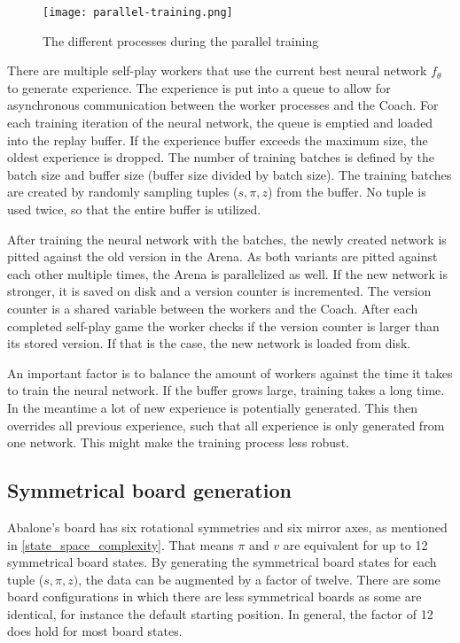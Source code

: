 \begin{figure}[H]
    \centering
    \texttt{[image: parallel-training.png]}
    \caption{The different processes during the parallel training \cite[cf. p. 45]{bruasdal_deep_2020}}
    \label{parallel_training_pipeline}
\end{figure}

There are multiple self-play workers that use the current best neural network $f_{\theta}$ to generate experience. The experience is put into a queue to allow for asynchronous communication between the worker processes and the Coach. For each training iteration of the neural network, the queue is emptied and loaded into the replay buffer. If the experience buffer exceeds the maximum size, the oldest experience is dropped. The number of training batches is defined by the batch size and buffer size (buffer size divided by batch size). The training batches are created by randomly sampling tuples ($s, \pi, z$) from the buffer. No tuple is used twice, so that the entire buffer is utilized.

After training the neural network with the batches, the newly created network is pitted against the old version in the Arena. As both variants are pitted against each other multiple times, the Arena is parallelized as well. If the new network is stronger, it is saved on disk and a version counter is incremented. The version counter is a shared variable between the workers and the Coach. After each completed self-play game the worker checks if the version counter is larger than its stored version. If that is the case, the new network is loaded from disk.

An important factor is to balance the amount of workers against the time it takes to train the neural network. If the buffer grows large, training takes a long time. In the meantime a lot of new experience is potentially generated. This then overrides all previous experience, such that all experience is only generated from one network. This might make the training process less robust.

\subsection{Symmetrical board generation}
Abalone's board has six rotational symmetries and six mirror axes, as mentioned in \ref{state_space_complexity}. That means $\pi$ and $v$ are equivalent for up to 12 symmetrical board states. By generating the symmetrical board states for each tuple ($s, \pi, z)$, the data can be augmented by a factor of twelve. There are some board configurations in which there are less symmetrical boards as some are identical, for instance the default starting position. In general, the factor of 12 does hold for most board states.

